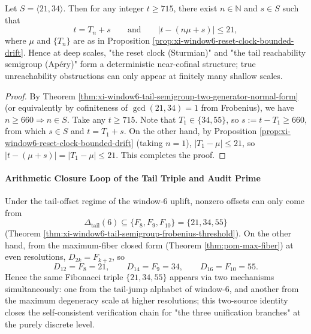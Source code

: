 \begin{corollary}\label{cor:xi-window6-reset-clock-semigroup-coupling}
Let \(S=\langle 21,34\rangle\).
Then for any integer \(t\ge 715\), there exist \(n\in\mathbb N\) and \(s\in S\) such that
\[
t=T_n+s
\qquad\text{and}\qquad
\bigl|t-(n\mu+s)\bigr|\le 21,
\]
where \(\mu\) and \(\{T_n\}\) are as in Proposition \ref{prop:xi-window6-reset-clock-bounded-drift}.
Hence at deep scales, "the reset clock (Sturmian)" and "the tail reachability semigroup (Ap\'ery)" form a deterministic near-cofinal structure; true unreachability obstructions can only appear at finitely many shallow scales.
\end{corollary}

\begin{proof}
By Theorem \ref{thm:xi-window6-tail-semigroup-two-generator-normal-form} (or equivalently by cofiniteness of \(\gcd(21,34)=1\) from Frobenius), we have \(n\ge 660\Rightarrow n\in S\).
Take any \(t\ge 715\).
Note that \(T_1\in\{34,55\}\), so \(s:=t-T_1\ge 660\), from which \(s\in S\) and \(t=T_1+s\).
On the other hand, by Proposition \ref{prop:xi-window6-reset-clock-bounded-drift} (taking \(n=1\)),
\(
|T_1-\mu|\le 21
\), so
\(
|t-(\mu+s)|=|T_1-\mu|\le 21
\).
This completes the proof.
\end{proof}

\paragraph{Arithmetic Closure Loop of the Tail Triple and Audit Prime}

\begin{corollary}\label{cor:xi-tail-offsets-maxfiber-triple-closure}
Under the tail-offset regime of the window-\(6\) uplift, nonzero offsets can only come from
\[
\Delta_{\mathrm{tail}}(6)\subseteq \{F_8,F_9,F_{10}\}=\{21,34,55\}
\]
(Theorem \ref{thm:xi-window6-tail-semigroup-frobenius-threshold}).
On the other hand, from the maximum-fiber closed form (Theorem \ref{thm:pom-max-fiber}) at even resolutions, \(D_{2k}=F_{k+2}\), so
\[
D_{12}=F_8=21,\qquad D_{14}=F_9=34,\qquad D_{16}=F_{10}=55.
\]
Hence the same Fibonacci triple \(\{21,34,55\}\) appears via two mechanisms simultaneously: one from the tail-jump alphabet of window-\(6\), and another from the maximum degeneracy scale at higher resolutions; this two-source identity closes the self-consistent verification chain for "the three unification branches" at the purely discrete level.
\end{corollary}

